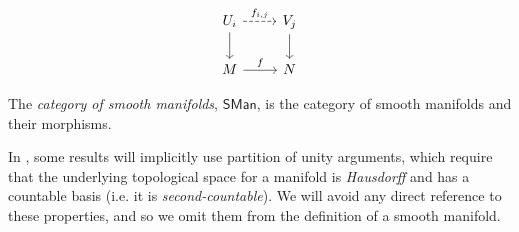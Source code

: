 \begin{definition}
    \[\begin{tikzcd}
        {U_i} & {V_j} \\
        M & N
        \arrow[from=1-1, to=2-1]
        \arrow[from=1-2, to=2-2]
        \arrow["f", from=2-1, to=2-2]
        \arrow["{f_{i,j}}", dashed, from=1-1, to=1-2]
    \end{tikzcd}\]

    The \emph{category of smooth manifolds}, $\mathsf{SMan}$, is the category of smooth manifolds and their morphisms.
\end{definition}
\begin{remark}
    In , some results will implicitly use partition of unity arguments, which require that the underlying topological space for a manifold is \emph{Hausdorff} and has a countable basis (i.e. it is \emph{second-countable}). We will avoid any direct reference to these properties, and so we omit them from the definition of a smooth manifold.
\end{remark}


